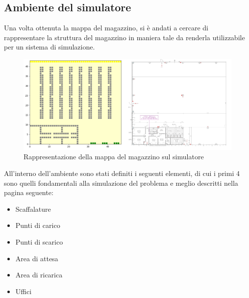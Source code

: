 \documentclass[12pt]{article}
\begin{document}
\subsection{Ambiente del simulatore}
Una volta ottenuta la mappa del magazzino, si è andati a cercare di rappresentare la struttura del magazzino in maniera tale da renderla utilizzabile per un sistema di simulazione.
\begin{figure}[ht]
\includegraphics[width=\linewidth]{Figures/Graphics/Simulation_Domain.PNG}
\caption{Rappresentazione della mappa del magazzino sul simulatore}\label{fig:Rappresentazione_mappa}
\end{figure}

\noindent All'interno dell'ambiente sono stati definiti i seguenti elementi, di cui i primi 4 sono quelli fondamentali alla simulazione del problema e meglio descritti nella pagina seguente:

\begin{itemize}
\item Scaffalature
\item Punti di carico
\item Punti di scarico
\item Area di attesa
\item Area di ricarica
\item Uffici
\end{itemize}
\newpage
\end{document}

